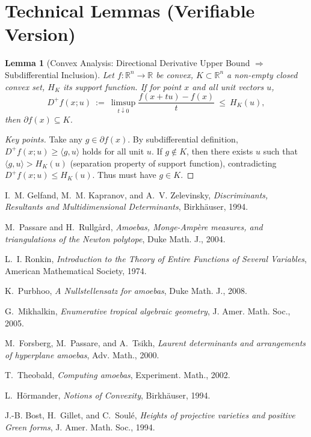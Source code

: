 \documentclass[11pt,a4paper]{article}
\newtheorem{lemma}[theorem]{Lemma}
\theoremstyle{remark}
\begin{document}
\appendix

\section{Technical Lemmas (Verifiable Version)}

\begin{lemma}[Convex Analysis: Directional Derivative Upper Bound $\Rightarrow$ Subdifferential Inclusion]\label{lem:convex_analysis}
Let $f: \mathbb{R}^n\to\mathbb{R}$ be convex, $K\subset\mathbb{R}^n$ a non-empty closed convex set, $H_K$ its support function. If for point $x$ and all unit vectors $u$,
\begin{equation}
D^{+}f(x;u)\ :=\ \limsup_{t\downarrow0}\frac{f(x+tu)-f(x)}{t}\ \le\ H_K(u),
\end{equation}
then $\partial f(x)\subseteq K$.
\end{lemma}

\begin{proof}[Key points]
Take any $g\in\partial f(x)$. By subdifferential definition, $D^{+}f(x;u)\ge \langle g,u\rangle$ holds for all unit $u$. If $g\notin K$, then there exists $u$ such that $\langle g,u\rangle>H_K(u)$ (separation property of support function), contradicting $D^{+}f(x;u)\le H_K(u)$. Thus must have $g\in K$.
\end{proof}

\begin{thebibliography}{9}

I.~M. Gelfand, M.~M. Kapranov, and A.~V. Zelevinsky, \emph{Discriminants, Resultants and Multidimensional Determinants}, Birkh\"auser, 1994.

M.~Passare and H.~Rullg\r{a}rd, \emph{Amoebas, Monge-Amp\`ere measures, and triangulations of the Newton polytope}, Duke Math. J., 2004.

L.~I. Ronkin, \emph{Introduction to the Theory of Entire Functions of Several Variables}, American Mathematical Society, 1974.

K.~Purbhoo, \emph{A Nullstellensatz for amoebas}, Duke Math. J., 2008.

G.~Mikhalkin, \emph{Enumerative tropical algebraic geometry}, J. Amer. Math. Soc., 2005.

M.~Forsberg, M.~Passare, and A.~Tsikh, \emph{Laurent determinants and arrangements of hyperplane amoebas}, Adv. Math., 2000.

T.~Theobald, \emph{Computing amoebas}, Experiment. Math., 2002.

L.~H\"ormander, \emph{Notions of Convexity}, Birkh\"auser, 1994.

J.-B. Bost, H.~Gillet, and C.~Soul\'e, \emph{Heights of projective varieties and positive Green forms}, J. Amer. Math. Soc., 1994.

\end{thebibliography}
\end{document}
